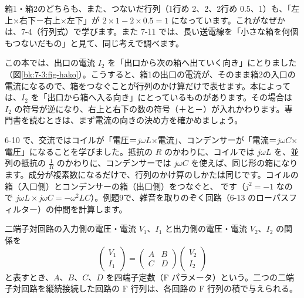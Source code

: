 箱1・箱2のどちらも、また、つないだ行列（1行め 2、2、2行め 0.5、1）も、「左上×右下－右上×左下」が $2\times1-2\times0.5=1$ になっています。これがなぜかは、7-4（行列式）で学びます。また 7-11 では、長い送電線を「小さな箱を何個もつないだもの」と見て、同じ考えで調べます。

\begin{seikaku}
この本では、出口の電流 $I_2$ を「出口から次の箱へ出ていく向き」にとりました（図\ref{bk:7-3:fig-hako}）。こうすると、箱1の出口の電流が、そのまま箱2の入口の電流になるので、箱をつなぐことが行列のかけ算だけで表せます。本によっては、$I_2$ を「出口から箱へ入る向き」にとっているものがあります。その場合は $I_2$ の符号が逆になり、右上と右下の数の符号（＋と－）が入れかわります。専門書を読むときは、まず電流の向きの決め方を確かめましょう。
\end{seikaku}

6-10 で、交流ではコイルが「電圧＝$j\omega L$×電流」、コンデンサーが「電流＝$j\omega C$×電圧」になることを学びました。抵抗の $R$ のかわりに、コイルでは $j\omega L$ を、並列の抵抗の $\frac1R$ のかわりに、コンデンサーでは $j\omega C$ を使えば、同じ形の箱になります。成分が複素数になるだけで、行列のかけ算のしかたは同じです。コイルの箱（入口側）とコンデンサーの箱（出口側）をつなぐと、
です（$j^2=-1$ なので $j\omega L\times j\omega C=-\omega^2LC$）。例題9で、雑音を取りのぞく回路（6-13 のローパスフィルター）の仲間を計算します。

\begin{senmonsho}[電気回路の本の書き方]
\begin{bkhonbun}
二端子対回路の入力側の電圧・電流 $V_1$、$I_1$ と出力側の電圧・電流 $V_2$、$I_2$ の関係を
\[ \begin{pmatrix}V_1\\I_1\end{pmatrix}=\begin{pmatrix}A&B\\C&D\end{pmatrix}\begin{pmatrix}V_2\\I_2\end{pmatrix} \]
と表すとき、$A$、$B$、$C$、$D$ を四端子定数（F パラメータ）という。二つの二端子対回路を縦続接続した回路の F 行列は、各回路の F 行列の積で与えられる。
\end{bkhonbun}
\end{senmonsho}

